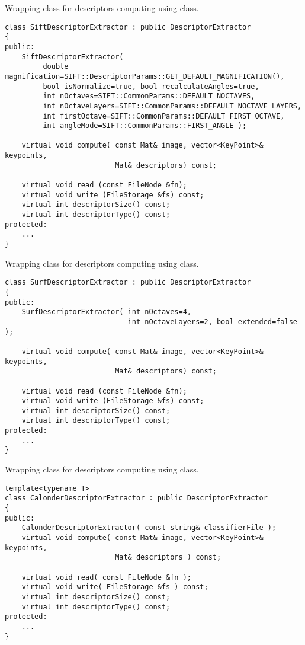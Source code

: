 
\begin{description}
\end{description}


Wrapping class for descriptors computing using  class.

\begin{lstlisting}
class SiftDescriptorExtractor : public DescriptorExtractor
{
public:
    SiftDescriptorExtractor( 
	     double magnification=SIFT::DescriptorParams::GET_DEFAULT_MAGNIFICATION(),
	     bool isNormalize=true, bool recalculateAngles=true,
	     int nOctaves=SIFT::CommonParams::DEFAULT_NOCTAVES,
	     int nOctaveLayers=SIFT::CommonParams::DEFAULT_NOCTAVE_LAYERS,
	     int firstOctave=SIFT::CommonParams::DEFAULT_FIRST_OCTAVE,
	     int angleMode=SIFT::CommonParams::FIRST_ANGLE );

    virtual void compute( const Mat& image, vector<KeyPoint>& keypoints, 
                          Mat& descriptors) const;

    virtual void read (const FileNode &fn);
    virtual void write (FileStorage &fs) const;
    virtual int descriptorSize() const;
    virtual int descriptorType() const;
protected:
    ...
}
\end{lstlisting}

Wrapping class for descriptors computing using  class.

\begin{lstlisting}
class SurfDescriptorExtractor : public DescriptorExtractor
{
public:
    SurfDescriptorExtractor( int nOctaves=4,
                             int nOctaveLayers=2, bool extended=false );

    virtual void compute( const Mat& image, vector<KeyPoint>& keypoints, 
                          Mat& descriptors) const;

    virtual void read (const FileNode &fn);
    virtual void write (FileStorage &fs) const;
    virtual int descriptorSize() const;
    virtual int descriptorType() const;
protected:
    ...
}
\end{lstlisting}

Wrapping class for descriptors computing using  class.

\begin{lstlisting}
template<typename T>
class CalonderDescriptorExtractor : public DescriptorExtractor
{
public:
    CalonderDescriptorExtractor( const string& classifierFile );
    virtual void compute( const Mat& image, vector<KeyPoint>& keypoints, 
                          Mat& descriptors ) const;
    
    virtual void read( const FileNode &fn );
    virtual void write( FileStorage &fs ) const;
    virtual int descriptorSize() const;
    virtual int descriptorType() const;
protected:
    ...
}
\end{lstlisting}

